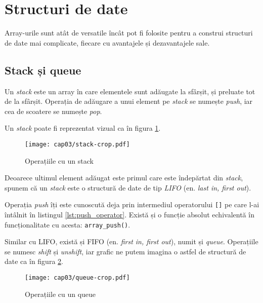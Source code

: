 




\section{Structuri de date}
Array-urile sunt atât de versatile încât pot fi folosite
pentru a construi structuri de date mai complicate, fiecare
cu avantajele și dezavantajele sale.

\subsection{Stack și queue}
Un \textsl{stack} este un array în care elementele sunt adăugate la sfârșit,
și preluate tot de la sfârșit. Operația de adăugare a unui element
pe \textit{stack} se numește \textsl{push}, iar cea de scoatere se numește \textsl{pop}.

Un \textit{stack} poate fi reprezentat vizual ca în figura \ref{fig:stack}.

\begin{figure}[ht!]
  \centering
    \texttt{[image: cap03/stack-crop.pdf]}
  \caption{Operațiile cu un stack}
  \label{fig:stack}
\end{figure}

Deoarece ultimul element adăugat este primul care este îndepărtat
din \textit{stack}, spunem că un \textit{stack} este o structură de date
de tip \textsl{LIFO} (en. \textsl{last in, first out}).

Operația \textit{push} îți este cunoscută deja prin intermediul
operatorului \texttt{[]} pe care l-ai întâlnit în
listingul \ref{lst:push_operator}. Există și o funcție
absolut echivalentă în funcționalitate cu acesta: \texttt{array\_push()}.

Similar cu LIFO, există și FIFO (en. \textsl{first in, first out}),
numit și \textsl{queue}. Operațiile se numesc \textsl{shift} și \textsl{unshift},
iar grafic ne putem imagina o astfel de structură de date ca în
figura \ref{fig:queue}.

\begin{figure}[ht!]
  \centering
    \texttt{[image: cap03/queue-crop.pdf]}
  \caption{Operațiile cu un queue}
  \label{fig:queue}
\end{figure}

